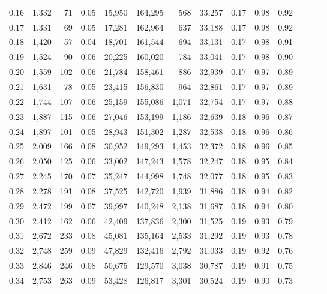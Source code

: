 \begin{tabular}{rrrrrrrrrrrrrr}
0.16 &  1,332 &   71 &  0.05 &   15,950 &  164,295 &     568 &  33,257 &  0.17 &  0.98 &      0.92 \\
0.17 &  1,331 &   69 &  0.05 &   17,281 &  162,964 &     637 &  33,188 &  0.17 &  0.98 &      0.92 \\
0.18 &  1,420 &   57 &  0.04 &   18,701 &  161,544 &     694 &  33,131 &  0.17 &  0.98 &      0.91 \\
0.19 &  1,524 &   90 &  0.06 &   20,225 &  160,020 &     784 &  33,041 &  0.17 &  0.98 &      0.90 \\
0.20 &  1,559 &  102 &  0.06 &   21,784 &  158,461 &     886 &  32,939 &  0.17 &  0.97 &      0.89 \\
0.21 &  1,631 &   78 &  0.05 &   23,415 &  156,830 &     964 &  32,861 &  0.17 &  0.97 &      0.89 \\
0.22 &  1,744 &  107 &  0.06 &   25,159 &  155,086 &   1,071 &  32,754 &  0.17 &  0.97 &      0.88 \\
0.23 &  1,887 &  115 &  0.06 &   27,046 &  153,199 &   1,186 &  32,639 &  0.18 &  0.96 &      0.87 \\
0.24 &  1,897 &  101 &  0.05 &   28,943 &  151,302 &   1,287 &  32,538 &  0.18 &  0.96 &      0.86 \\
0.25 &  2,009 &  166 &  0.08 &   30,952 &  149,293 &   1,453 &  32,372 &  0.18 &  0.96 &      0.85 \\
0.26 &  2,050 &  125 &  0.06 &   33,002 &  147,243 &   1,578 &  32,247 &  0.18 &  0.95 &      0.84 \\
0.27 &  2,245 &  170 &  0.07 &   35,247 &  144,998 &   1,748 &  32,077 &  0.18 &  0.95 &      0.83 \\
0.28 &  2,278 &  191 &  0.08 &   37,525 &  142,720 &   1,939 &  31,886 &  0.18 &  0.94 &      0.82 \\
0.29 &  2,472 &  199 &  0.07 &   39,997 &  140,248 &   2,138 &  31,687 &  0.18 &  0.94 &      0.80 \\
0.30 &  2,412 &  162 &  0.06 &   42,409 &  137,836 &   2,300 &  31,525 &  0.19 &  0.93 &      0.79 \\
0.31 &  2,672 &  233 &  0.08 &   45,081 &  135,164 &   2,533 &  31,292 &  0.19 &  0.93 &      0.78 \\
0.32 &  2,748 &  259 &  0.09 &   47,829 &  132,416 &   2,792 &  31,033 &  0.19 &  0.92 &      0.76 \\
0.33 &  2,846 &  246 &  0.08 &   50,675 &  129,570 &   3,038 &  30,787 &  0.19 &  0.91 &      0.75 \\
0.34 &  2,753 &  263 &  0.09 &   53,428 &  126,817 &   3,301 &  30,524 &  0.19 &  0.90 &      0.73 \\

\end{tabular}

